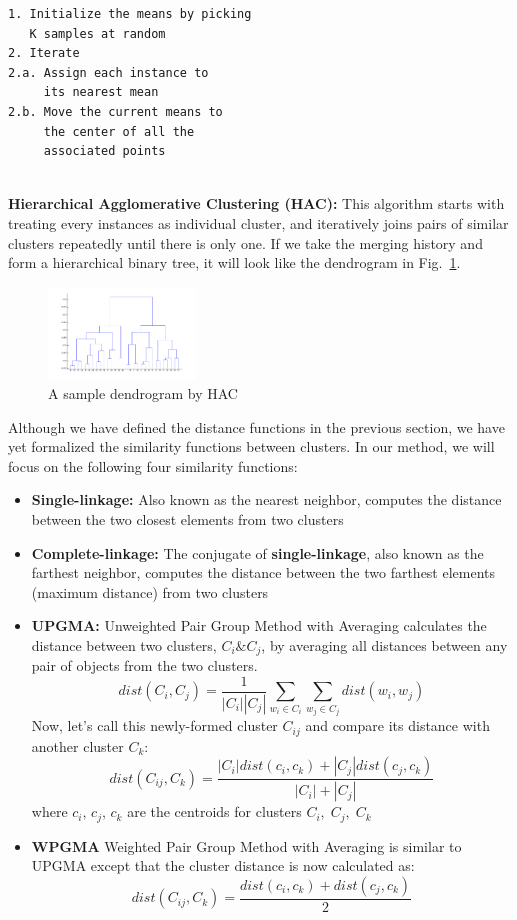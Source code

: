 \documentclass[conference]{IEEEtran}
\begin{document}
\begin{verbatim}
1. Initialize the means by picking 
   K samples at random
2. Iterate
2.a. Assign each instance to 
     its nearest mean
2.b. Move the current means to 
	 the center of all the 
	 associated points
\end{verbatim}
\-\\
\textbf{Hierarchical Agglomerative Clustering (HAC):} This algorithm starts with treating every instances as individual cluster, and iteratively joins pairs of similar clusters repeatedly until there is only one. If we take the merging history and form a hierarchical binary tree, it will look like the dendrogram in Fig.~\ref{dendrogram}.

\begin{figure}[h]
	\center	
	\includegraphics[width=0.35\textwidth]{fig/dendrogram.png}
	\caption{A sample dendrogram by HAC}
	\label{dendrogram}
\end{figure}

Although we have defined the distance functions in the previous section, we have yet formalized the similarity functions between clusters. In our method, we will focus on the following four similarity functions:

\begin{itemize}
	\item \textbf{Single-linkage:} Also known as the nearest neighbor, computes the distance between the two closest elements from two clusters
	\item \textbf{Complete-linkage:} The conjugate of \textbf{single-linkage}, also known as the farthest neighbor, computes the distance between the two farthest elements (maximum distance) from two clusters
	\item \textbf{UPGMA: } Unweighted Pair Group Method with Averaging calculates the distance between two clusters, $C_i \& C_j$, by averaging all distances between any pair of objects from the two clusters.
	\begin{equation*}
		dist(C_i, C_j) = \frac{1}{|C_i||C_j|}\sum_{w_i \in C_i}\sum_{w_j \in C_j}dist(w_i, w_j)
	\end{equation*}
	Now, let's call this newly-formed cluster $C_{ij}$ and compare its distance with another cluster $C_k$:
	\begin{equation*}
		dist(C_{ij}, C_k) =  \frac{|C_i|dist(c_i,c_k) + |C_j|dist(c_j,c_k)}{|C_i|+|C_j|}
	\end{equation*}
	where $c_i,\,c_j,\,c_k$ are the centroids for clusters $C_i,\;C_j,\;C_k$
	\item \textbf{WPGMA} Weighted Pair Group Method with Averaging is similar to UPGMA except that the cluster distance is now calculated as:
	\begin{equation*}
		dist(C_{ij}, C_k) =  \frac{dist(c_i,c_k) + dist(c_j,c_k)}{2}
	\end{equation*}
\end{itemize}
\end{document}

